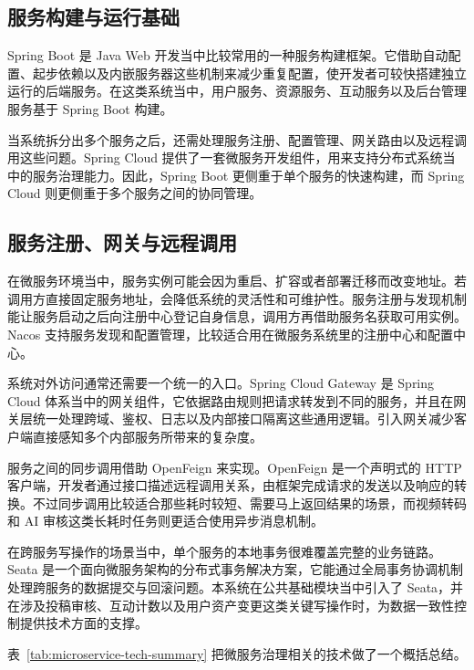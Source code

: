 \subsection{服务构建与运行基础}
\label{subsec:spring-boot-cloud}

Spring Boot 是 Java Web 开发当中比较常用的一种服务构建框架。它借助自动配置、起步依赖以及内嵌服务器这些机制来减少重复配置，使开发者可较快搭建独立运行的后端服务\cite{springbootdocs}。在这类系统当中，用户服务、资源服务、互动服务以及后台管理服务基于 Spring Boot 构建。

当系统拆分出多个服务之后，还需处理服务注册、配置管理、网关路由以及远程调用这些问题。Spring Cloud 提供了一套微服务开发组件，用来支持分布式系统当中的服务治理能力\cite{springclouddocs}。因此，Spring Boot 更侧重于单个服务的快速构建，而 Spring Cloud 则更侧重于多个服务之间的协同管理。

\subsection{服务注册、网关与远程调用}
\label{subsec:registry-gateway-feign}

在微服务环境当中，服务实例可能会因为重启、扩容或者部署迁移而改变地址。若调用方直接固定服务地址，会降低系统的灵活性和可维护性。服务注册与发现机制能让服务启动之后向注册中心登记自身信息，调用方再借助服务名获取可用实例。Nacos 支持服务发现和配置管理，比较适合用在微服务系统里的注册中心和配置中心\cite{nacosdocs}。

系统对外访问通常还需要一个统一的入口。Spring Cloud Gateway 是 Spring Cloud 体系当中的网关组件，它依据路由规则把请求转发到不同的服务，并且在网关层统一处理跨域、鉴权、日志以及内部接口隔离这些通用逻辑\cite{springgatewaydocs}。引入网关减少客户端直接感知多个内部服务所带来的复杂度。

服务之间的同步调用借助 OpenFeign 来实现。OpenFeign 是一个声明式的 HTTP 客户端，开发者通过接口描述远程调用关系，由框架完成请求的发送以及响应的转换\cite{springopenfeign}。不过同步调用比较适合那些耗时较短、需要马上返回结果的场景，而视频转码和 AI 审核这类长耗时任务则更适合使用异步消息机制。

在跨服务写操作的场景当中，单个服务的本地事务很难覆盖完整的业务链路。Seata 是一个面向微服务架构的分布式事务解决方案，它能通过全局事务协调机制处理跨服务的数据提交与回滚问题\cite{seatadocs}。本系统在公共基础模块当中引入了 Seata，并在涉及投稿审核、互动计数以及用户资产变更这类关键写操作时，为数据一致性控制提供技术方面的支撑。

表~\ref{tab:microservice-tech-summary} 把微服务治理相关的技术做了一个概括总结。


